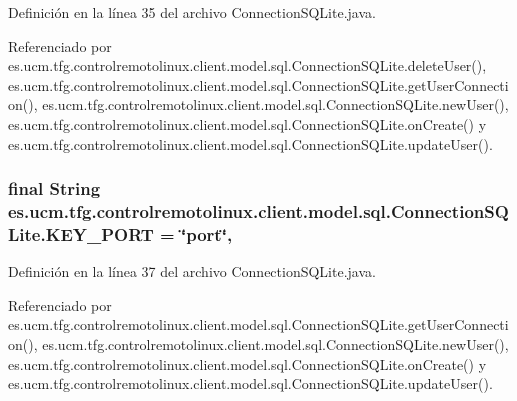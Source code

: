 Definición en la línea 35 del archivo Connection\-S\-Q\-Lite.\-java.



Referenciado por es.\-ucm.\-tfg.\-controlremotolinux.\-client.\-model.\-sql.\-Connection\-S\-Q\-Lite.\-delete\-User(), es.\-ucm.\-tfg.\-controlremotolinux.\-client.\-model.\-sql.\-Connection\-S\-Q\-Lite.\-get\-User\-Connection(), es.\-ucm.\-tfg.\-controlremotolinux.\-client.\-model.\-sql.\-Connection\-S\-Q\-Lite.\-new\-User(), es.\-ucm.\-tfg.\-controlremotolinux.\-client.\-model.\-sql.\-Connection\-S\-Q\-Lite.\-on\-Create() y es.\-ucm.\-tfg.\-controlremotolinux.\-client.\-model.\-sql.\-Connection\-S\-Q\-Lite.\-update\-User().

\hypertarget{classes_1_1ucm_1_1tfg_1_1controlremotolinux_1_1client_1_1model_1_1sql_1_1ConnectionSQLite_a9ff99d0cf0f9730b0cb37038b9dab67d}{
\subsubsection[{K\-E\-Y\-\_\-\-P\-O\-R\-T}]{\setlength{\rightskip}{0pt plus 5cm}final String es.\-ucm.\-tfg.\-controlremotolinux.\-client.\-model.\-sql.\-Connection\-S\-Q\-Lite.\-K\-E\-Y\-\_\-\-P\-O\-R\-T = \char`\"{}port\char`\"{}\hspace{0.3cm}{\ttfamily [static]}, {\ttfamily [private]}}}\label{classes_1_1ucm_1_1tfg_1_1controlremotolinux_1_1client_1_1model_1_1sql_1_1ConnectionSQLite_a9ff99d0cf0f9730b0cb37038b9dab67d}


Definición en la línea 37 del archivo Connection\-S\-Q\-Lite.\-java.



Referenciado por es.\-ucm.\-tfg.\-controlremotolinux.\-client.\-model.\-sql.\-Connection\-S\-Q\-Lite.\-get\-User\-Connection(), es.\-ucm.\-tfg.\-controlremotolinux.\-client.\-model.\-sql.\-Connection\-S\-Q\-Lite.\-new\-User(), es.\-ucm.\-tfg.\-controlremotolinux.\-client.\-model.\-sql.\-Connection\-S\-Q\-Lite.\-on\-Create() y es.\-ucm.\-tfg.\-controlremotolinux.\-client.\-model.\-sql.\-Connection\-S\-Q\-Lite.\-update\-User().

